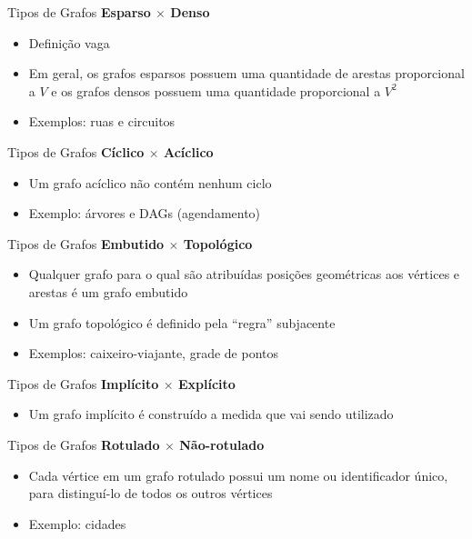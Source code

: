\documentclass[10pt]{beamer}
\begin{document}
\begin{frame}{Tipos de Grafos}
  \vfill
  \centering
  \huge \textbf{Esparso $\times$ Denso}
  \vfill
  \raggedright
  \large
  \begin{itemize}
    \item Definição vaga
    \item Em geral, os grafos esparsos possuem uma quantidade de arestas proporcional a $V$ e os grafos densos possuem uma quantidade proporcional a $V^2$
    \item Exemplos: ruas e circuitos
  \end{itemize}
\end{frame}

\begin{frame}{Tipos de Grafos}
  \vfill
  \centering
  \huge \textbf{Cíclico $\times$ Acíclico}
  \vfill
  \raggedright
  \large
  \begin{itemize}
    \item Um grafo acíclico não contém nenhum ciclo
    \item Exemplo: árvores e DAGs (agendamento)
  \end{itemize}
\end{frame}

\begin{frame}{Tipos de Grafos}
  \vfill
  \centering
  \huge \textbf{Embutido $\times$ Topológico}
  \vfill
  \raggedright
  \large
  \begin{itemize}
    \item Qualquer grafo para o qual são atribuídas posições geométricas aos vértices e arestas é um grafo embutido
    \item Um grafo topológico é definido pela ``regra'' subjacente
    \item Exemplos: caixeiro-viajante, grade de pontos
  \end{itemize}
\end{frame}

\begin{frame}{Tipos de Grafos}
  \vfill
  \centering
  \huge \textbf{Implícito $\times$ Explícito}
  \vfill
  \raggedright
  \large
  \begin{itemize}
    \item Um grafo implícito é construído a medida que vai sendo utilizado
  \end{itemize}
\end{frame}

\begin{frame}{Tipos de Grafos}
  \vfill
  \centering
  \huge \textbf{Rotulado $\times$ Não-rotulado}
  \vfill
  \raggedright
  \large
  \begin{itemize}
    \item Cada vértice em um grafo rotulado possui um nome ou identificador único, para distinguí-lo de todos os outros vértices
    \item Exemplo: cidades
  \end{itemize}
\end{frame}
\end{document}
